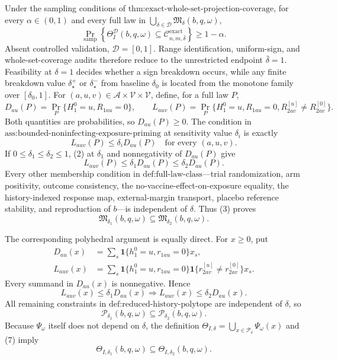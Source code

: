 Under the sampling conditions of \(\text{thm:exact-whole-set-projection-coverage}\), for every \(\alpha\in(0,1)\) and every full law in \(\bigcup_{\delta\in\mathcal D}\mathfrak M_\delta(b,q,\omega)\),
\[
 \Pr_{\mathrm{samp}}\!\left\{
 \Theta_I^{\mathcal D}(b,q,\omega)
 \subseteq\mathcal C_{n,m,\bar\delta}^{\mathrm{exact}}
 \right\}\geq1-\alpha.
\]
Absent controlled validation, \(\mathcal D=[0,1]\). Range identification, uniform-sign, and whole-set-coverage audits therefore reduce to the unrestricted endpoint \(\bar\delta=1\). Feasibility at \(\delta=1\) decides whether a sign breakdown occurs, while any finite breakdown value \(\delta_\star^+\) or \(\delta_\star^-\) from baseline \(\delta_0\) is located from the monotone family over \([\delta_0,1]\).
For \((a,u,v)\in\mathcal A\times\mathcal V\times\mathcal V\), define, for a full law \(P\),
\[
 D_{au}(P)=\Pr_P\{H_1^0=u,R_{1au}=0\},
 \qquad
 L_{auv}(P)=\Pr_P\{H_1^0=u,R_{1au}=0,
 R^{[u]}_{2av}\neq R^{[0]}_{2av}\}.
\tag{1}
\]
Both quantities are probabilities, so \(D_{au}(P)\geq0\).  The condition in \(\text{ass:bounded-noninfecting-exposure-priming}\) at sensitivity value \(\delta_i\) is exactly
\[
 L_{auv}(P)\leq\delta_iD_{au}(P)
 \quad\text{for every }(a,u,v).
\tag{2}
\]
If \(0\leq\delta_1\leq\delta_2\leq1\), (2) at \(\delta_1\) and nonnegativity of \(D_{au}(P)\) give
\[
 L_{auv}(P)
 \leq\delta_1D_{au}(P)
 \leq\delta_2D_{au}(P).
\tag{3}
\]
Every other membership condition in \(\text{def:full-law-class}\)—trial randomization, arm positivity, outcome consistency, the no-vaccine-effect-on-exposure equality, the history-indexed response map, external-margin transport, placebo reference stability, and reproduction of \(b\)—is independent of \(\delta\).  Thus (3) proves
\[
 \mathfrak M_{\delta_1}(b,q,\omega)
 \subseteq\mathfrak M_{\delta_2}(b,q,\omega).
\tag{4}
\]

The corresponding polyhedral argument is equally direct.  For \(x\geq0\), put
\[
 \begin{aligned}
 D_{au}(x)
 &=\sum_s\mathbf 1\{h_1^0=u,r_{1au}=0\}x_s,\\
 L_{auv}(x)
 &=\sum_s\mathbf 1\{h_1^0=u,r_{1au}=0\}
       \mathbf 1\{r^{[u]}_{2av}\neq r^{[0]}_{2av}\}x_s.
 \end{aligned}
\tag{5}
\]
Every summand in \(D_{au}(x)\) is nonnegative.  Hence
\[
 L_{auv}(x)\leq\delta_1D_{au}(x)
 \Longrightarrow
 L_{auv}(x)\leq\delta_2D_{au}(x).
\tag{6}
\]
All remaining constraints in \(\text{def:reduced-history-polytope}\) are independent of \(\delta\), so
\[
 \mathcal P_{\delta_1}(b,q,\omega)
 \subseteq\mathcal P_{\delta_2}(b,q,\omega).
\tag{7}
\]
Because \(\Psi_\omega\) itself does not depend on \(\delta\), the definition \(\Theta_{I,\delta}=\bigcup_{x\in\mathcal P_\delta}\Psi_\omega(x)\) and (7) imply
\[
 \Theta_{I,\delta_1}(b,q,\omega)
 \subseteq\Theta_{I,\delta_2}(b,q,\omega).
\tag{8}
\]

